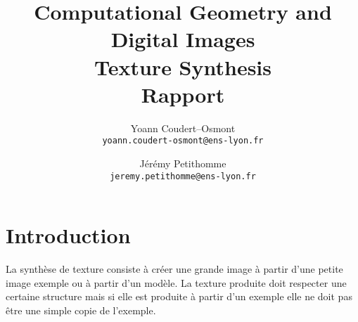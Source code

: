 \documentclass[12pt]{article}
\title{
	Computational Geometry and Digital Images\\
	\textbf{Texture Synthesis}\\
	Rapport
}
\author{
	Yoann Coudert--Osmont \\ \texttt{yoann.coudert-osmont@ens-lyon.fr}
	\and
	Jérémy Petithomme \\ \texttt{jeremy.petithomme@ens-lyon.fr}
}
\begin{document}
	
\maketitle

\section{Introduction}
	
La synthèse de texture consiste à créer une grande image à partir d'une petite image exemple ou à partir d'un modèle. La texture produite doit respecter une certaine structure mais si elle est produite à partir d'un exemple elle ne doit pas être une simple copie de l'exemple.
\end{document}
